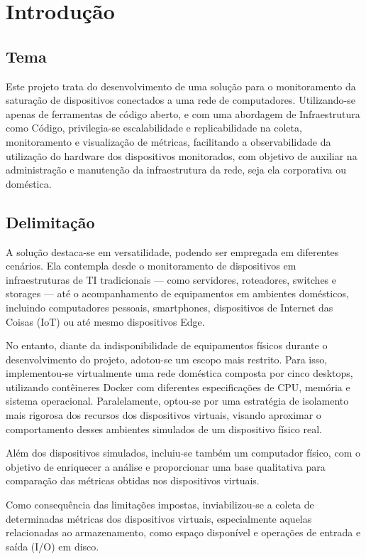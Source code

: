 \chapter{Introdução}

\section{Tema}

Este projeto trata do desenvolvimento de uma solução para o monitoramento da saturação de dispositivos conectados a uma rede de computadores. Utilizando-se apenas de ferramentas de código aberto, e com uma abordagem de Infraestrutura como Código, privilegia-se escalabilidade e replicabilidade na coleta, monitoramento e visualização de métricas, facilitando a observabilidade da utilização do hardware dos dispositivos monitorados, com objetivo de auxiliar na administração e manutenção da infraestrutura da rede, seja ela corporativa ou doméstica.

\section{Delimitação}

A solução destaca-se em versatilidade, podendo ser empregada em diferentes cenários. Ela contempla desde o monitoramento de dispositivos em infraestruturas de TI tradicionais — como servidores, roteadores, switches e storages — até o acompanhamento de equipamentos em ambientes domésticos, incluindo computadores pessoais, smartphones, dispositivos de Internet das Coisas (IoT) ou até mesmo dispositivos Edge.

No entanto, diante da indisponibilidade de equipamentos físicos durante o desenvolvimento do projeto, adotou-se um escopo mais restrito. Para isso, implementou-se virtualmente uma rede doméstica composta por cinco desktops, utilizando contêineres Docker com diferentes especificações de CPU, memória e sistema operacional. Paralelamente, optou-se por uma estratégia de isolamento mais rigorosa dos recursos dos dispositivos virtuais, visando aproximar o comportamento desses ambientes simulados de um dispositivo físico real.

Além dos dispositivos simulados, incluiu-se também um computador físico, com o objetivo de enriquecer a análise e proporcionar uma base qualitativa para comparação das métricas obtidas nos dispositivos virtuais.

Como consequência das limitações impostas, inviabilizou-se a coleta de determinadas métricas dos dispositivos virtuais, especialmente aquelas relacionadas ao armazenamento, como espaço disponível e operações de entrada e saída (I/O) em disco.


